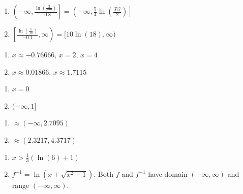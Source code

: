 \begin{multicols}{2} 
\begin{enumerate}
\setcounter{enumi}{\value{HW}}

\item $\left(-\infty, \frac{\ln\left(\frac{2}{377}\right)}{-0.8} \right] = \left(-\infty, \frac{5}{4}\ln\left(\frac{377}{2}\right) \right]$
\item $\left[\frac{\ln\left(\frac{1}{18}\right)}{-0.1}, \infty\right) = [10\ln(18), \infty)$

\setcounter{HW}{\value{enumi}}
\end{enumerate}
\end{multicols}

\begin{multicols}{2} 
\begin{enumerate}
\setcounter{enumi}{\value{HW}}

\item $x \approx -0.76666, \, x = 2, \, x = 4$
\item $x \approx 0.01866, \, x \approx 1.7115$


\setcounter{HW}{\value{enumi}}
\end{enumerate}
\end{multicols}

\begin{multicols}{2} 
\begin{enumerate}
\setcounter{enumi}{\value{HW}}

\item $x = 0$
\item $(-\infty, 1]$

\setcounter{HW}{\value{enumi}}
\end{enumerate}
\end{multicols}

\begin{multicols}{2} 
\begin{enumerate}
\setcounter{enumi}{\value{HW}}

\item $\approx (-\infty, 2.7095)$
\item $\approx (2.3217, 4.3717)$


\setcounter{HW}{\value{enumi}}
\end{enumerate}
\end{multicols}


\begin{enumerate}
\setcounter{enumi}{\value{HW}}

\item $x > \frac{1}{3}(\ln(6) + 1)$

\item  $f^{-1} = \ln\left(x + \sqrt{x^{2} + 1}\right)$. Both $f$ and $f^{-1}$ have domain $(-\infty, \infty)$ and range $(-\infty, \infty)$.


\end{enumerate}

\closegraphsfile